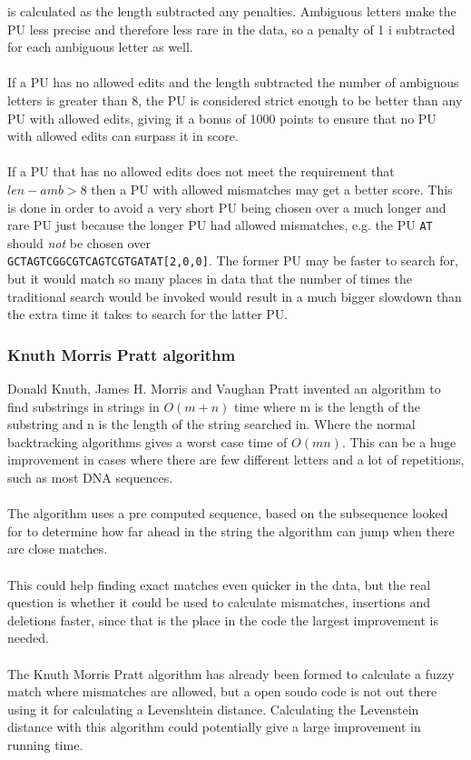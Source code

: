 \documentclass[12pt]{article}
\newcommand{\pu}{PU }
\newcommand{\pup}{PU. }
\begin{document}
is calculated as the length subtracted any penalties. Ambiguous letters make the \pu less precise and therefore less
rare in the data, so a penalty of 1 i subtracted for each ambiguous letter as well. \\ \\
If a \pu has no allowed edits and the length subtracted the number of ambiguous letters is greater than 8, 
the \pu is considered strict enough to be better than any \pu with allowed edits, giving it a bonus of 1000 points to
ensure that no \pu with allowed edits can surpass it in score. \\ \\
If a \pu that has no allowed edits does not meet the requirement that $len-amb>8$ then a \pu with allowed
mismatches may get a better score. This is done in order to avoid a very short \pu being chosen over a much longer
and rare \pu just because the longer \pu had allowed mismatches, e.g. the \pu\; \texttt{AT}\; should \emph{not} be chosen
over \\
\texttt{GCTAGTCGGCGTCAGTCGTGATAT[2,0,0]}. The former \pu may be faster to search for, but it would match so many
places in data that the number of times the traditional search would be invoked would result in a much bigger
slowdown than the extra time it takes to search for the latter \pup
\subsubsection{Knuth Morris Pratt algorithm}
Donald Knuth, James H. Morris and Vaughan Pratt invented an algorithm to find substrings in strings in $O(m+n)$
time where m is the length of the substring and n is the length of the string searched in. 
Where the normal backtracking algorithms gives a worst case time of $O(mn)$. This can be a huge improvement in cases where there are few different letters and a lot of repetitions, such as most DNA sequences. \\ \\
The algorithm uses a pre computed sequence, based on the subsequence looked for to determine how far ahead in the string the algorithm can jump when there are close matches. \\ \\
This could help finding exact matches even quicker in the data, but the real question is whether it could be used to calculate mismatches, insertions and deletions faster, since that is the place in the code the largest improvement is needed. \\ \\
The Knuth Morris Pratt algorithm has already been formed to calculate a fuzzy match where mismatches are allowed, but a open soudo code is not out there using it for calculating a Levenshtein distance. Calculating the Levenstein distance with this algorithm could potentially give a large improvement in running time.
\end{document}
